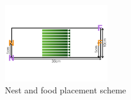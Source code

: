 \begin{figure}[h]
    	\includegraphics[width=0.4\textwidth]{img/model_components_cartoons_010}
				\vspace{-8ex}
				\caption{Nest and food placement scheme}
\end{figure}
